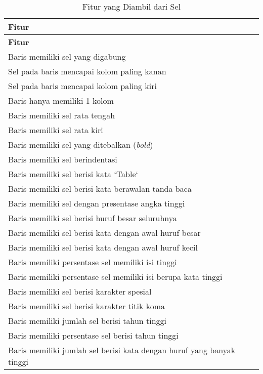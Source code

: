 \begin{small}
\begin{longtable}{ | p{10cm} | }
    \caption{Fitur yang Diambil dari Sel}
    \label{FiturEkstraksi}\\ \hline
    \centering\bfseries{Fitur} \tabularnewline \hline
    \endfirsthead
    \hline
    \centering\bfseries{Fitur} \tabularnewline \hline
    \endhead
    Baris memiliki sel yang digabung \\ \hline
    Sel pada baris mencapai kolom paling kanan \\ \hline
    Sel pada baris mencapai kolom paling kiri \\ \hline
    Baris hanya memiliki 1 kolom \\ \hline
    Baris memiliki sel rata tengah \\ \hline
    Baris memiliki sel rata kiri \\ \hline
    Baris memiliki sel yang ditebalkan (\textit{bold}) \\ \hline
    Baris memiliki sel berindentasi \\ \hline
    Baris memiliki sel berisi kata `Table` \\ \hline
    Baris memiliki sel berisi kata berawalan tanda baca \\ \hline
    Baris memiliki sel dengan presentase angka tinggi \\ \hline
    Baris memiliki sel berisi huruf besar seluruhnya \\ \hline
    Baris memiliki sel berisi kata dengan awal huruf besar \\ \hline
    Baris memiliki sel berisi kata dengan awal huruf kecil \\ \hline
    Baris memiliki persentase sel memiliki isi tinggi \\ \hline
    Baris memiliki persentase sel memiliki isi berupa kata tinggi \\ \hline
    Baris memiliki sel berisi karakter spesial \\ \hline
    Baris memiliki sel berisi karakter titik koma \\ \hline
    Baris memiliki jumlah sel berisi tahun tinggi \\ \hline
    Baris memiliki persentase sel berisi tahun tinggi \\ \hline
    Baris memiliki jumlah sel berisi kata dengan huruf yang banyak tinggi \\ \hline
\end{longtable}
\end{small}

